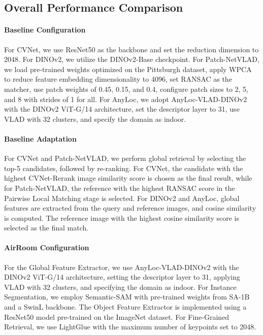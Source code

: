 \subsection{Overall Performance Comparison}
\label{sec:appendix_overall}

\paragraph{Baseline Configuration} For CVNet, we use ResNet50 as the backbone and set the reduction dimension to 2048. For DINOv2, we utilize the DINOv2-Base checkpoint. For Patch-NetVLAD, we load pre-trained weights optimized on the Pittsburgh dataset, apply WPCA to reduce feature embedding dimensionality to 4096, set RANSAC as the matcher, use patch weights of 0.45, 0.15, and 0.4, configure patch sizes to 2, 5, and 8 with strides of 1 for all. For AnyLoc, we adopt AnyLoc-VLAD-DINOv2 with the DINOv2 ViT-G/14 architecture, set the descriptor layer to 31, use VLAD with 32 clusters, and specify the domain as \mbox{indoor}.

\paragraph{Baseline Adaptation} For CVNet and Patch-NetVLAD, we perform global retrieval by selecting the top-5 candidates, followed by re-ranking. For CVNet, the candidate with the highest CVNet-Rerank image similarity score is chosen as the final result, while for Patch-NetVLAD, the reference with the highest RANSAC score in the Pairwise Local Matching stage is selected. For DINOv2 and AnyLoc, global features are extracted from the query and reference images, and cosine similarity is computed. The reference image with the highest cosine similarity score is selected as the final match.

\paragraph{AirRoom Configuration} For the Global Feature Extractor, we use AnyLoc-VLAD-DINOv2 with the DINOv2 ViT-G/14 architecture, setting the descriptor layer to 31, applying VLAD with 32 clusters, and specifying the domain as indoor. For Instance Segmentation, we employ Semantic-SAM with pre-trained weights from SA-1B and a SwinL backbone. The Object Feature Extractor is implemented using a ResNet50 model pre-trained on the ImageNet dataset. For Fine-Grained Retrieval, we use LightGlue with the maximum number of keypoints set to 2048.

